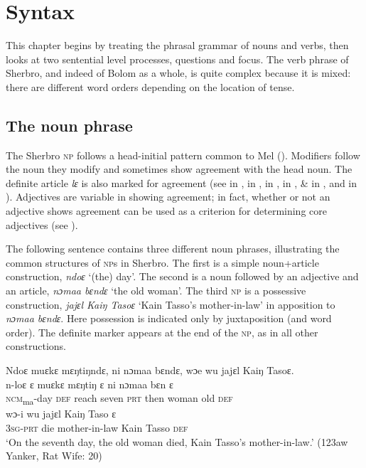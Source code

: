 \chapter{Syntax}
\label{ch:8}\hypertarget{Toc115517812}{}
This chapter begins by treating the phrasal grammar of nouns and verbs, then looks at two sentential level processes, questions and focus. The verb phrase of Sherbro, and indeed of Bolom as a whole, is quite complex because it is mixed: there are different word orders depending on the location of tense.

\section{The noun phrase}
\label{sec:8.1}\hypertarget{Toc115517813}{}
The Sherbro \textsc{np} follows a head-initial pattern common to Mel (\citealt{Childs2024c}). Modifiers follow the noun they modify and sometimes show agreement with the head noun. The definite article \textit{lɛ} is also marked for agreement (see  in ,  in ,  in ,  in ,  \&  in , and  in ). Adjectives are variable in showing agreement; in fact, whether or not an adjective shows agreement can be used as a criterion for determining core adjectives (see ).

The following sentence contains three different noun phrases, illustrating the common structures of \textsc{np}s in Sherbro. The first is a simple noun+article construction, \textit{ndoɛ} ‘(the) day'. The second is a noun followed by an adjective and an article, \textit{nɔmaa bɛndɛ} ‘the old woman'. The third \textsc{np} is a possessive construction, \textit{jajɛl Kaiŋ Tasoɛ} ‘Kain Tasso's mother-in-law' in apposition to \textit{nɔmaa bɛndɛ}. Here possession is indicated only by juxtaposition (and word order). The definite marker appears at the end of the \textsc{np}, as in all other constructions.

\ea%
    \label{ex:195}
    Ndoɛ muɛkɛ mɛŋtiŋndɛ, ni nɔmaa bɛndɛ, wɔe wu jajɛl Kaiŋ Tasoɛ.\\
    \gll n-loɛ      ɛ    muɛkɛ  mɛŋtiŋ  ɛ    ni    nɔmaa  bɛn  ɛ\\
    \textsc{ncm}\textsubscript{ma}{}-day  \textsc{def}   reach    seven    \textsc{prt}  then  woman  old  \textsc{def}\\
    \gll wɔ{}-i      wu  jajɛl          Kaiŋ  Taso    ɛ\\
    \textsc{3sg-prt}    die  mother-in-law    Kain  Tasso    \textsc{def}\\
    \glt ‘On the seventh day, the old woman died, Kain Tasso's mother-in-law.' (123aw Yanker, Rat Wife: 20)
\z

